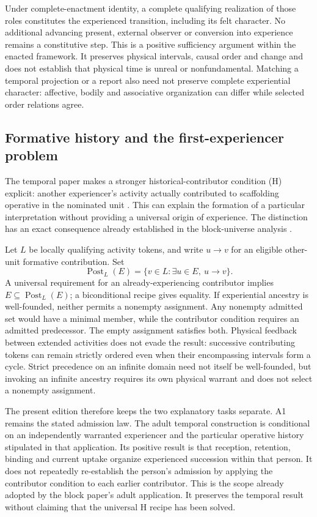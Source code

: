 Under complete-enactment identity, a complete qualifying realization of those roles constitutes the experienced transition, including its felt character. No additional advancing present, external observer or conversion into experience remains a constitutive step. This is a positive sufficiency argument within the enacted framework. It preserves physical intervals, causal order and change and does not establish that physical time is unreal or nonfundamental. Matching a temporal projection or a report also need not preserve complete experiential character: affective, bodily and associative organization can differ while selected order relations agree.

\subsection{Formative history and the first-experiencer problem}
\label{sec:formative-history-scope}
The temporal paper makes a stronger historical-contributor condition (H) explicit: another experiencer's activity actually contributed to scaffolding operative in the nominated unit \cite[Section~2.3]{RodgersTemporal2026}. This can explain the formation of a particular interpretation without providing a universal origin of experience. The distinction has an exact consequence already established in the block-universe analysis \cite[Appendix~B]{RodgersBlock2026}.

Let $L$ be locally qualifying activity tokens, and write $u\to v$ for an eligible other-unit formative contribution. Set
\[
\operatorname{Post}_L(E)=\{v\in L:\exists u\in E,\ u\to v\}.
\]
A universal requirement for an already-experiencing contributor implies $E\subseteq\operatorname{Post}_L(E)$; a biconditional recipe gives equality. If experiential ancestry is well-founded, neither permits a nonempty assignment. Any nonempty admitted set would have a minimal member, while the contributor condition requires an admitted predecessor. The empty assignment satisfies both. Physical feedback between extended activities does not evade the result: successive contributing tokens can remain strictly ordered even when their encompassing intervals form a cycle. Strict precedence on an infinite domain need not itself be well-founded, but invoking an infinite ancestry requires its own physical warrant and does not select a nonempty assignment.

The present edition therefore keeps the two explanatory tasks separate. A1 remains the stated admission law. The adult temporal construction is conditional on an independently warranted experiencer and the particular operative history stipulated in that application. Its positive result is that reception, retention, binding and current uptake organize experienced succession within that person. It does not repeatedly re-establish the person's admission by applying the contributor condition to each earlier contributor. This is the scope already adopted by the block paper's adult application. It preserves the temporal result without claiming that the universal H recipe has been solved.

